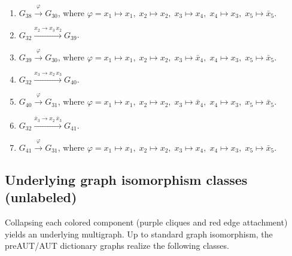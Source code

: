 \begin{enumerate}[leftmargin=*]
\item $G_{38} \xrightarrow{\varphi} G_{30}$, where $\varphi=x_{1} \mapsto x_{1},\; x_{2} \mapsto x_{2},\; x_{3} \mapsto x_{4},\; x_{4} \mapsto x_{3},\; x_{5} \mapsto \bar{x}_{5}$.
\item $G_{32} \xrightarrow{x_{2} \to x_{3}\,x_{2}} G_{39}$.
\item $G_{39} \xrightarrow{\varphi} G_{30}$, where $\varphi=x_{1} \mapsto x_{1},\; x_{2} \mapsto x_{2},\; x_{3} \mapsto \bar{x}_{4},\; x_{4} \mapsto x_{3},\; x_{5} \mapsto \bar{x}_{5}$.
\item $G_{32} \xrightarrow{x_{3} \to x_{2}\,x_{3}} G_{40}$.
\item $G_{40} \xrightarrow{\varphi} G_{31}$, where $\varphi=x_{1} \mapsto x_{1},\; x_{2} \mapsto x_{2},\; x_{3} \mapsto \bar{x}_{4},\; x_{4} \mapsto x_{3},\; x_{5} \mapsto \bar{x}_{5}$.
\item $G_{32} \xrightarrow{\bar{x}_{3} \to x_{2}\,\bar{x}_{3}} G_{41}$.
\item $G_{41} \xrightarrow{\varphi} G_{31}$, where $\varphi=x_{1} \mapsto x_{1},\; x_{2} \mapsto x_{2},\; x_{3} \mapsto x_{4},\; x_{4} \mapsto x_{3},\; x_{5} \mapsto \bar{x}_{5}$.
\end{enumerate}

\subsection*{Underlying graph isomorphism classes (unlabeled)}
Collapsing each colored component (purple cliques and red edge attachment) yields an underlying multigraph. Up to standard graph isomorphism, the preAUT/AUT dictionary graphs realize the following classes.

